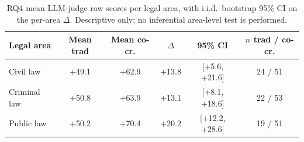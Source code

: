 \begin{table}[t]
\centering\footnotesize
\caption{RQ4 mean LLM-judge raw scores per legal area, with i.i.d.\ bootstrap 95\% CI on the per-area $\Delta$. Descriptive only; no inferential area-level test is performed.}
\label{tbl-rq4-by-bereich}
\setlength{\tabcolsep}{4pt}
\begin{tabular*}{\textwidth}{@{\extracolsep{\fill}}lccccc@{}}
\toprule
Legal area & Mean trad & Mean co-cr. & $\Delta$ & 95\% CI & $n$ trad / co-cr. \\
\midrule
Civil law & +49.1 & +62.9 & +13.8 & [+5.6, +21.6] & 24 / 51 \\
Criminal law & +50.8 & +63.9 & +13.1 & [+8.1, +18.6] & 22 / 53 \\
Public law & +50.2 & +70.4 & +20.2 & [+12.2, +28.6] & 19 / 51 \\
\bottomrule
\end{tabular*}
\end{table}
